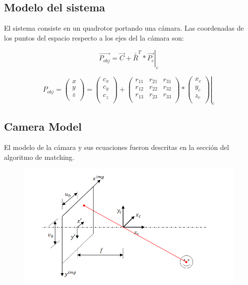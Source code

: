 \subsection{Modelo del sistema} \label{subsec:system_model}
El sistema consiste en un quadrotor portando una c\'amara. Las coordenadas de los puntos del espacio respecto a los ejes del la c\'amara son:

\begin{equation}
\left. \overrightarrow{P_{obj}} = \overrightarrow{C} + \bar{\bar{R}}^{T}*\overrightarrow{P_{c}} \right|_c
\end{equation}

\begin{equation} \label{eq:system_equation}
P_{obj} = 
	\left.
	\begin{pmatrix}
	x \\
	y \\
	z \\
	\end{pmatrix}
=
	\begin{pmatrix}
	c_x \\
	c_y \\
	c_z \\
	\end{pmatrix}
+
	\begin{pmatrix}
	r_{11} & r_{21} & r_{31} \\
	r_{12} & r_{22} & r_{32} \\
	r_{13} & r_{23} & r_{33} \\
	\end{pmatrix}
*
	\begin{pmatrix}
	x_c \\
	y_c \\
	z_c \\
	\end{pmatrix}
	\right|_c
\end{equation}


\subsection{Camera Model}
	El modelo de la c\'amara \cite{camera_models}  y sus ecuaciones fueron descritas en la secci\'on del algoritmo de matching.
	
	\begin{figure}[ph]
		\centering
		\includegraphics[width=0.7\linewidth]{../Images/c2/pinhole_model}
		\caption{}
		\label{fig:pinhole_model}
	\end{figure}

